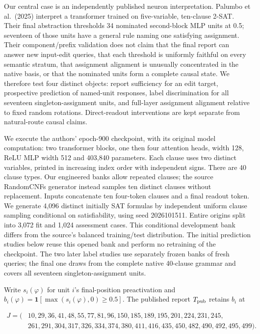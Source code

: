 \documentclass[
  british,
  11pt,
  a4paper,
]{article}
\begin{document}
Our central case is an independently published neuron interpretation.
Palumbo et al.~(2025) interpret a transformer trained on five-variable,
ten-clause 2-SAT. Their final abstraction thresholds 34 nominated
second-block MLP units at 0.5; seventeen of those units have a general
rule naming one satisfying assignment. Their component/prefix validation
does not claim that the final report can answer new input-edit queries,
that each threshold is uniformly faithful on every semantic stratum,
that assignment alignment is unusually concentrated in the native basis,
or that the nominated units form a complete causal state. We therefore
test four distinct objects: report sufficiency for an edit target,
prospective prediction of named-unit responses, label discrimination for
all seventeen singleton-assignment units, and full-layer assignment
alignment relative to fixed random rotations. Direct-readout
interventions are kept separate from natural-route causal claims.

We execute the authors' epoch-900 checkpoint, with its original model
computation: two transformer blocks, one then four attention heads,
width 128, ReLU MLP width 512 and 403,840 parameters. Each clause uses
two distinct variables, printed in increasing index order with
independent signs. There are 40 clause types. Our engineered banks allow
repeated clauses; the source RandomCNFs generator instead samples ten
distinct clauses without replacement. Inputs concatenate ten four-token
clauses and a final readout token. We generate 4,096 distinct initially
SAT formulas by independent uniform clause sampling conditional on
satisfiability, using seed 2026101511. Entire origins split into 3,072
fit and 1,024 assessment cases. This conditional development bank
differs from the source's balanced training/test distribution. The
initial prediction studies below reuse this opened bank and perform no
retraining of the checkpoint. The two later label studies use separately
frozen banks of fresh queries; the final one draws from the complete
native 40-clause grammar and covers all seventeen singleton-assignment
units.

Write \(s_i(\varphi)\) for unit \(i\)'s final-position preactivation and
\(b_i(\varphi)=\mathbf1[\max(s_i(\varphi),0)\ge0.5]\). The published
report \(T_{\rm pub}\) retains \(b_i\) at

\[
\begin{aligned}
J=(&10,29,36,41,48,55,77,81,96,150,185,189,195,201,224,231,245,\\
   &261,291,304,317,326,334,374,380,411,416,435,450,482,490,492,495,499).
\end{aligned}
\]
\end{document}
